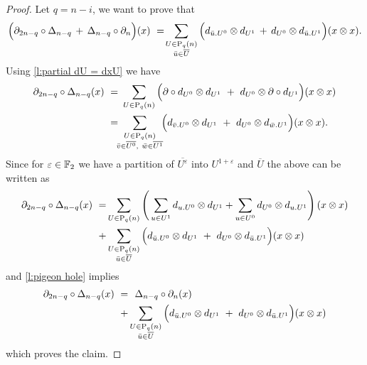 \begin{proof}
	Let $q = n-i$, we want to prove that
	\begin{equation*}
	\Big( \partial_{2n-q} \circ \Delta_{n - q} \, +\, \Delta_{n-q} \circ \partial_n \Big) (x) \ = \!
	\sum_{\substack{U \in \mathrm{P}_{q}(n) \\ {\bar{u}} \in \overline{U}}} \Big( d_{{\bar{u}}.U^0} \otimes d_{U^1} \, + \, d_{U^0} \otimes d_{{\bar{u}}.U^1} \Big) (x \otimes x).
	\end{equation*}
	Using \cref{l:partial dU = dxU} we have
	\begin{equation*}
	\begin{split}
	\partial_{2n-q} \circ \Delta_{n - q} (x) \ = & \
	\sum_{U \in \P_q(n)} \Big( \partial \circ d_{U^0} \otimes d_{U^1}\ +\
	d_{U^0} \otimes \partial \circ d_{U^1} \Big) (x \otimes x) \\ = & \!\!
	\sum_{\substack{U \in \P_q(n) \\ \bar v \in \overline{U^0},\ \bar w \in \overline{U^1} } }\!\! \Big( d_{\bar v.U^0} \otimes d_{U^1}\ +\ d_{U^0} \otimes d_{\bar w.U^1}\Big) (x \otimes x).
	\end{split}
	\end{equation*}
	Since for $\varepsilon \in {\mathbb{F}_2}$ we have a partition of $\overline{U^\varepsilon}$ into $U^{1+\varepsilon}$ and $\overline{U}$ the above can be written as
	\begin{align*}
	\partial_{2n-q} \circ \Delta_{n - q} (x) \ = &
	\sum_{U \in \mathrm{P}_q(n)} \left( \,
	\sum_{u \in U^1} d_{u.U^0} \otimes d_{U^1} +
	\sum_{u \in U^0} d_{U^0} \otimes d_{u.U^1} \right)(x \otimes x) \\ + &
	\sum_{\substack{U\in\mathrm{P}_{q}(n) \\ {\bar{u}} \in \overline{U}}} \Big( d_{{\bar{u}}.U^0} \otimes d_{U^1}\ +\ d_{U^0} \otimes d_{{\bar{u}}.U^1}\Big) (x \otimes x)
	\end{align*}
	and \cref{l:pigeon hole} implies
	\begin{align*}
	\partial_{2n-q} \circ \Delta_{n - q} (x) \ =& \ \
	\Delta_{n-q} \circ \partial_n (x) \ \  \\ +&
	\sum_{\substack{U\in\mathrm{P}_{q}(n) \\ {\bar{u}} \in \overline{U}}} \Big( d_{{\bar{u}}.U^0} \otimes d_{U^1}\ +\ d_{U^0} \otimes d_{{\bar{u}}.U^1}\Big) (x \otimes x)
	\end{align*}
	which proves the claim.
\end{proof}

